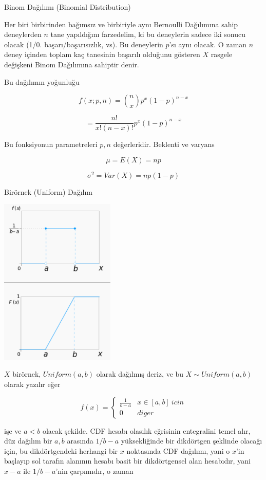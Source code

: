 \documentclass[12pt,fleqn]{article}\usepackage{../../common}
\begin{document}
Binom Dağılımı (Binomial Distribution)

Her biri birbirinden bağımsız ve birbiriyle aynı Bernoulli Dağılımına sahip
deneylerden $n$ tane yapıldığını farzedelim, ki bu deneylerin sadece iki
sonucu olacak (1/0. başarı/başarısızlık, vs). Bu deneylerin $p$'sı aynı
olacak. O zaman $n$ deney içinden toplam kaç tanesinin başarılı olduğunu
gösteren $X$ rasgele değişkeni Binom Dağılımına sahiptir denir. 

Bu dağılımın yoğunluğu 

$$ f(x;p,n) = {n \choose{x}} p^x(1-p)^{n-x} 
$$

$$ = \frac{n!}{x!(n-x)!} p^x(1-p)^{n-x}  $$

Bu fonksiyonun parametreleri $p,n$ değerleridir. Beklenti ve varyans

$$ \mu = E(X) = np $$

$$ \sigma^2 = Var(X) = np(1-p) $$

Birörnek (Uniform) Dağılım

\includegraphics[height=8cm]{stat_intro_05.png}

$X$ birörnek, $Uniform(a,b)$ olarak dağılmış deriz, ve  bu 
$X \sim Uniform(a,b)$ olarak yazılır eğer 

$$ f(x)  = 
\left\{ \begin{array}{ll}
\frac{ 1}{b-a} & x \in [a,b] \ icin \\
0 & diger
\end{array} \right.
 $$

işe ve $a<b$ olacak şekilde. CDF hesabı olasılık eğrisinin entegralini
temel alır, düz dağılım bir $a,b$ arasında $1/b-a$ yüksekliğinde bir 
dikdörtgen şeklinde olacağı için, bu dikdörtgendeki herhangi bir $x$
noktasında CDF dağılımı, yani o $x$'in başlayıp sol tarafın alanının hesabı
basit bir dikdörtgensel alan hesabıdır, yani $x-a$ ile $1/b-a$'nin
çarpımıdır, o zaman 
\end{document}
